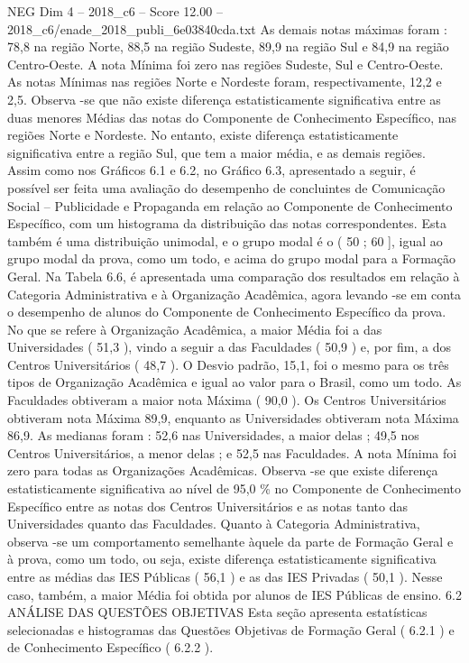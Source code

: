 \begin{textsample}{NEG Dim 4 – 2018\_c6 – Score 12.00 – 2018\_c6/enade\_2018\_publi\_6e03840cda.txt}
As demais notas máximas foram : 78,8 na região Norte, 88,5 na região Sudeste, 89,9 na região Sul e 84,9 na região Centro-Oeste.
A nota Mínima foi zero nas regiões Sudeste, Sul e Centro-Oeste.
As notas Mínimas nas regiões Norte e Nordeste foram, respectivamente, 12,2 e 2,5.
Observa -se que não existe diferença estatisticamente significativa entre as duas menores Médias das notas do Componente de Conhecimento Específico, nas regiões Norte e Nordeste.
No entanto, existe diferença estatisticamente significativa entre a região Sul, que tem a maior média, e as demais regiões.
Assim como nos Gráficos 6.1 e 6.2, no Gráfico 6.3, apresentado a seguir, é possível ser feita uma avaliação do desempenho de concluintes de Comunicação Social – Publicidade e Propaganda em relação ao Componente de Conhecimento Específico, com um histograma da distribuição das notas correspondentes.
Esta também é uma distribuição unimodal, e o grupo modal é o ( 50 ; 60 ], igual ao grupo modal da prova, como um todo, e acima do grupo modal para a Formação Geral.
Na Tabela 6.6, é apresentada uma comparação dos resultados em relação à Categoria Administrativa e à Organização Acadêmica, agora levando -se em conta o desempenho de alunos do Componente de Conhecimento Específico da prova.
No que se refere à Organização Acadêmica, a maior Média foi a das Universidades ( 51,3 ), vindo a seguir a das Faculdades ( 50,9 ) e, por fim, a dos Centros Universitários ( 48,7 ).
O Desvio padrão, 15,1, foi o mesmo para os três tipos de Organização Acadêmica e igual ao valor para o Brasil, como um todo.
As Faculdades obtiveram a maior nota Máxima ( 90,0 ).
Os Centros Universitários obtiveram nota Máxima 89,9, enquanto as Universidades obtiveram nota Máxima 86,9.
As medianas foram : 52,6 nas Universidades, a maior delas ; 49,5 nos Centros Universitários, a menor delas ; e 52,5 nas Faculdades.
A nota Mínima foi zero para todas as Organizações Acadêmicas.
Observa -se que existe diferença estatisticamente significativa ao nível de 95,0 \% no Componente de Conhecimento Específico entre as notas dos Centros Universitários e as notas tanto das Universidades quanto das Faculdades.
Quanto à Categoria Administrativa, observa -se um comportamento semelhante àquele da parte de Formação Geral e à prova, como um todo, ou seja, existe diferença estatisticamente significativa entre as médias das IES Públicas ( 56,1 ) e as das IES Privadas ( 50,1 ).
Nesse caso, também, a maior Média foi obtida por alunos de IES Públicas de ensino. 6.2 ANÁLISE DAS QUESTÕES OBJETIVAS Esta seção apresenta estatísticas selecionadas e histogramas das Questões Objetivas de Formação Geral ( 6.2.1 ) e de Conhecimento Específico ( 6.2.2 ).

\end{textsample}
